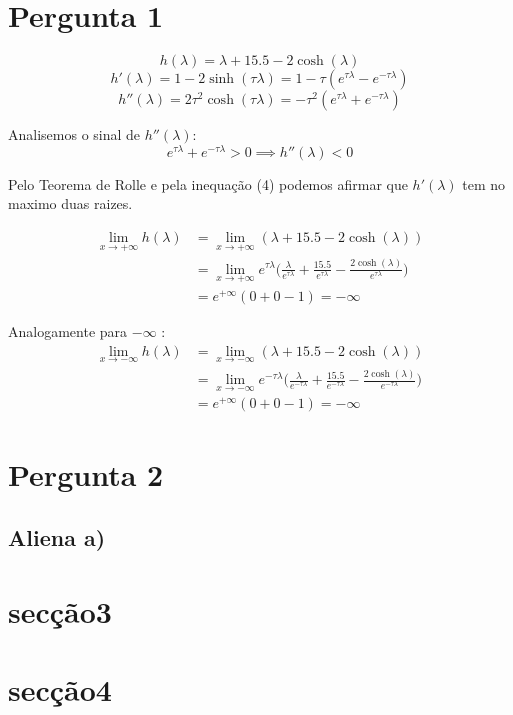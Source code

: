 \documentclass[12pt]{article}
\begin{document}
	



\section{Pergunta 1}
\begin{equation}
	h(\lambda) = \lambda + 15.5 - 2\cosh(\lambda)
\end{equation}
\begin{equation}
	h'(\lambda) = 1 - 2\sinh(\tau\lambda) = 1 - \tau(e^{\tau\lambda} - e^{-\tau\lambda})
\end{equation}
\begin{equation}
	h''(\lambda) = 2\tau^2\cosh(\tau\lambda) = -\tau^2(e^{\tau\lambda} + e^{-\tau\lambda})
\end{equation}

Analisemos o sinal de $h''(\lambda)$: 
\begin{equation}
	e^{\tau\lambda} + e^{-\tau\lambda} > 0 \implies h''(\lambda) < 0
\end{equation}

Pelo Teorema de Rolle e pela inequação (4) podemos afirmar que
$h'(\lambda)$ tem no maximo duas raizes.

\begin{equation}
\begin{split}
	\lim_{x \to +\infty} h(\lambda) 
	&= \lim_{x \to +\infty} (\lambda + 15.5 - 2\cosh(\lambda)) \\
	&= \lim_{x \to +\infty} e^{\tau\lambda} \bigg(\frac{\lambda}{e^{\tau\lambda}} + \frac{15.5}{e^{\tau\lambda}} - \frac{2\cosh(\lambda)}{e^{\tau\lambda}}\bigg) \\
	&= e^{+\infty} (0 + 0 - 1) = -\infty
\end{split}
\end{equation}

Analogamente para  $-\infty$ :
\begin{equation}
\begin{split}
	\lim_{x \to -\infty} h(\lambda) 
	&= \lim_{x \to -\infty} (\lambda + 15.5 - 2\cosh(\lambda)) \\
	&= \lim_{x \to -\infty} e^{-\tau\lambda} \bigg(\frac{\lambda}{e^{-\tau\lambda}} + \frac{15.5}{e^{-\tau\lambda}} - \frac{2\cosh(\lambda)}{e^{-\tau\lambda}}\bigg) \\
	&= e^{+\infty} (0 + 0 - 1) = -\infty
\end{split}
\end{equation}

\section{Pergunta 2}
\subsection{Aliena a)}

\section{secção3}

\section{secção4}
\end{document}
